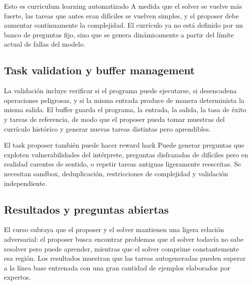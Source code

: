 \documentclass[a4paper]{article}
\begin{document}
\begin{knowledgebox}{Esto es curriculum learning automatizado}
A medida que el solver se vuelve más fuerte, las tareas que antes eran difíciles se vuelven simples, y el proposer debe aumentar continuamente la complejidad. El currículo ya no está definido por un banco de preguntas fijo, sino que se genera dinámicamente a partir del límite actual de fallas del modelo.
\end{knowledgebox}

\subsection{Task validation y buffer management}


La validación incluye verificar si el programa puede ejecutarse, si desencadena operaciones peligrosas, y si la misma entrada produce de manera determinista la misma salida. El buffer guarda el programa, la entrada, la salida, la tasa de éxito y tareas de referencia, de modo que el proposer pueda tomar muestras del currículo histórico y generar nuevas tareas distintas pero aprendibles.

\begin{warningbox}{El task proposer también puede hacer reward hack}
Puede generar preguntas que exploten vulnerabilidades del intérprete, preguntas disfrazadas de difíciles pero en realidad carentes de sentido, o repetir tareas antiguas ligeramente reescritas. Se necesitan sandbox, deduplicación, restricciones de complejidad y validación independiente.
\end{warningbox}

\subsection{Resultados y preguntas abiertas}


El curso subraya que el proposer y el solver mantienen una ligera relación adversarial: el proposer busca encontrar problemas que el solver todavía no sabe resolver pero puede aprender, mientras que el solver comprime constantemente esa región. Los resultados muestran que las tareas autogeneradas pueden superar a la línea base entrenada con una gran cantidad de ejemplos elaborados por expertos.
\end{document}
